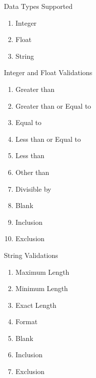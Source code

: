 \documentclass[a4paper,12pt]{article}
\begin{document}
\par Data Types Supported
\begin{enumerate}
\item Integer
\item Float
\item String
\end{enumerate}

\par Integer and Float Validations
\begin{enumerate}
\item Greater than
\item Greater than or Equal to
\item Equal to
\item Less than or Equal to
\item Less than
\item Other than
\item Divisible by
\item Blank
\item Inclusion
\item Exclusion
\end{enumerate}

\par String Validations
\begin{enumerate}
\item Maximum Length
\item Minimum Length
\item Exact Length
\item Format
\item Blank
\item Inclusion
\item Exclusion
\end{enumerate}
\end{document}
